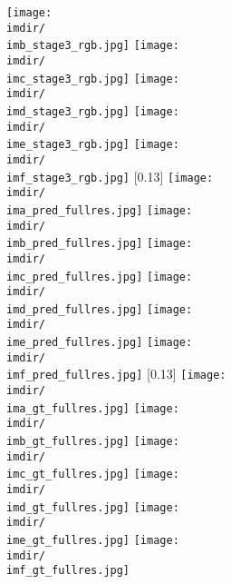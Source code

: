\documentclass[runningheads]{llncs}
\begin{document}
\begin{figure*}[hthb]
{\texttt{[image: \\imdir/\\imb\_stage3\_rgb.jpg]}
\texttt{[image: \\imdir/\\imc\_stage3\_rgb.jpg]}
\texttt{[image: \\imdir/\\imd\_stage3\_rgb.jpg]}
\texttt{[image: \\imdir/\\ime\_stage3\_rgb.jpg]}
\texttt{[image: \\imdir/\\imf\_stage3\_rgb.jpg]}
}
[0.13\linewidth]
{
\texttt{[image: \\imdir/\\ima\_pred\_fullres.jpg]}
\texttt{[image: \\imdir/\\imb\_pred\_fullres.jpg]}
\texttt{[image: \\imdir/\\imc\_pred\_fullres.jpg]}
\texttt{[image: \\imdir/\\imd\_pred\_fullres.jpg]}
\texttt{[image: \\imdir/\\ime\_pred\_fullres.jpg]}
\texttt{[image: \\imdir/\\imf\_pred\_fullres.jpg]}
}
[0.13\linewidth]
{
\texttt{[image: \\imdir/\\ima\_gt\_fullres.jpg]}
\texttt{[image: \\imdir/\\imb\_gt\_fullres.jpg]}
\texttt{[image: \\imdir/\\imc\_gt\_fullres.jpg]}
\texttt{[image: \\imdir/\\imd\_gt\_fullres.jpg]}
\texttt{[image: \\imdir/\\ime\_gt\_fullres.jpg]}
\texttt{[image: \\imdir/\\imf\_gt\_fullres.jpg]}
}


\end{figure*}
\end{document}
